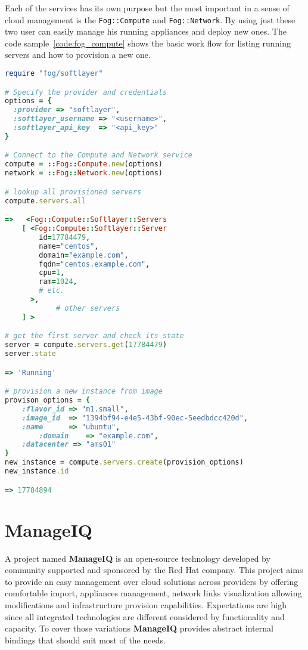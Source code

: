 Each of the services has its own purpose but the most important in a sense of cloud management is the \texttt{Fog::Compute} and \texttt{Fog::Network}. By using just these two user can easily manage his running appliances and deploy new ones. The code sample~\ref{code:fog_compute} shows the basic work flow for listing running servers and how to provision a new one.

\begin{lstlisting}[language=Ruby,caption={Example work flow for Fog SoftLayer},label=code:fog_compute,float=htpb]
require "fog/softlayer"

# Specify the provider and credentials
options = {
  :provider => "softlayer",
  :softlayer_username => "<username>",
  :softlayer_api_key  => "<api_key>"
}

# Connect to the Compute and Network service
compute = ::Fog::Compute.new(options)
network = ::Fog::Network.new(options)

# lookup all provisioned servers
compute.servers.all

=>   <Fog::Compute::Softlayer::Servers
    [ <Fog::Compute::Softlayer::Server
        id=17784479,
        name="centos",
        domain="example.com",
        fqdn="centos.example.com",
        cpu=1,
        ram=1024,
        # etc.
      >,
			# other servers
    ] >

# get the first server and check its state
server = compute.servers.get(17784479)
server.state

=> 'Running'

# provision a new instance from image
provison_options = {
    :flavor_id => "m1.small",
    :image_id  => "1394bf94-e4e5-43bf-90ec-5eedbdcc420d",
    :name      => "ubuntu",
		:domain    => "example.com",
    :datacenter => "ams01"
}
new_instance = compute.servers.create(provision_options)
new_instance.id

=> 17784894
\end{lstlisting}

\chapter{ManageIQ}
\label{chap:ManageIQ}

A project named \textbf{ManageIQ} is an open-source technology developed by community supported and sponsored by the Red Hat company. This project aims to provide an easy management over cloud solutions across providers by offering comfortable import, appliances management, network links visualization allowing modifications and infrastructure provision capabilities. Expectations are high since all integrated technologies are different considered by functionality and capacity. To cover those variations \textbf{ManageIQ} provides abstract internal bindings that should suit most of the needs.

